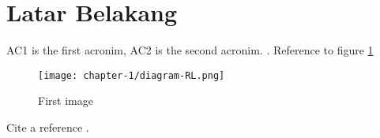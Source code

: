 \section{Latar Belakang}

\ac{AC1} is the first acronim, \ac{AC2} is the second acronim. \lipsum[1]. Reference to figure \ref{imref1}

\begin{figure}[h]
	\centering
	\texttt{[image: chapter-1/diagram-RL.png]}
	\caption{First image}
	\label{imref1}
\end{figure}

\lipsum[2] Cite a reference \parencite{wang2022efficient}.
